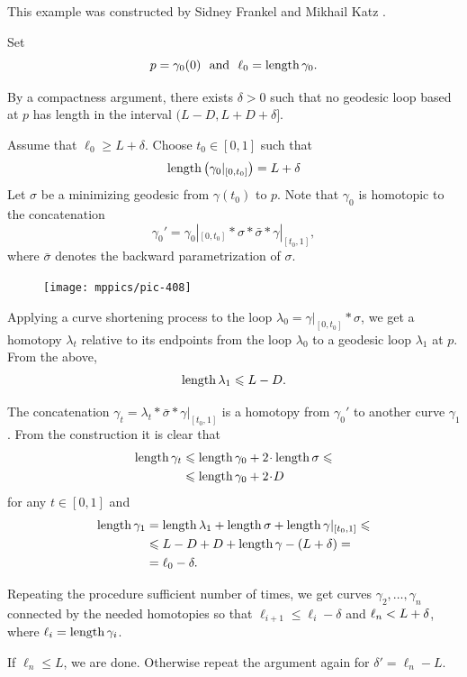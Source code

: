 This example was constructed by Sidney Frankel and Mikhail Katz \cite{frankel-katz}.
 

Set 
\[p=\gamma_0(0)\ \ \text{and}\ \  \ell_0=\length\gamma_0.\]

By a compactness argument,
there exists $\delta>0$ 
such that no geodesic loop based at $p$ has length in the interval $(L-D, L+D+\delta]$. 

Assume that $\ell_0\ge L+\delta$.
Choose $t_0\in [0,1]$ such that
\[\operatorname{\rm length}\left(\gamma_0|_{[0,t_0]}\right)=L+\delta\]
Let $\sigma$ be a minimizing geodesic from $\gamma(t_0)$
to $p$.
Note that $\gamma_0$ is homotopic to the concatenation 
\[\gamma_0'=\gamma_0|_{[0,t_0]}*\sigma*\bar\sigma*\gamma|_{[t_0,1]},\]
where $\bar\sigma$ denotes the backward parametrization of $\sigma$.

\begin{figure}
\vskip-2mm
\centering
\texttt{[image: mppics/pic-408]}
\end{figure}

Applying a curve shortening process to the loop $\lambda_0=\gamma|_{[0,t_0]}*\sigma$, 
we get a  homotopy $\lambda_t$
relative to its endpoints 
from the loop $\lambda_0$ to a geodesic loop $\lambda_1$ at $p$.
From the above, 
\[\operatorname{\rm length}\lambda_1\leqslant L-D.\]

The concatenation $\gamma_t=\lambda_t*\bar\sigma*\gamma|_{[t_0,1]}$
is a homotopy
from $\gamma_0'$ to another curve $\gamma_1$.
From the construction it is clear that 
\begin{align*}
 \length \gamma_t&\le \length \gamma_0+2\cdot \length\sigma\le
 \\
 &\le \length \gamma_0+2\cdot D
\end{align*}
for any $t\in[0,1]$
and 
\begin{align*}
 \operatorname{\rm length} \gamma_1&=\operatorname{\rm length}\lambda_1+\operatorname{\rm length}\sigma+\operatorname{\rm length}\gamma|_{[t_0,1]}\leqslant
\\ &\leqslant L-D+D+\operatorname{\rm length}\gamma-(L+\delta)=
\\ &=\ell_0 -\delta.
\end{align*}

Repeating the procedure sufficient number of times, we get curves $\gamma_2,\dots,\gamma_n$
connected by the needed homotopies so that 
$\ell_{i+1}\le\ell_i-\delta$ and $\ell_n\z< L+\delta$,
where $\ell_i=\operatorname{\rm length}\gamma_i$.

If $\ell_n\le L$, we are done.
Otherwise repeat the argument again for $\delta'=\ell_n-L$.
\qeds

